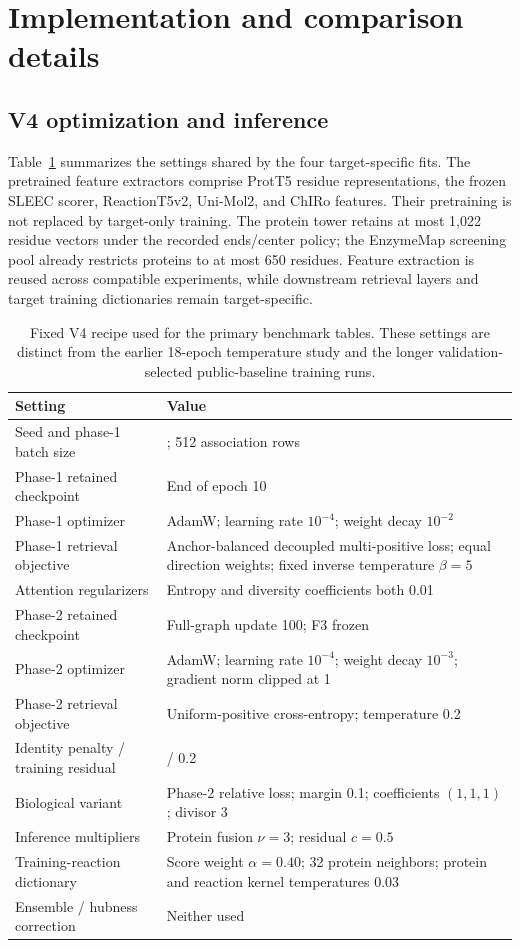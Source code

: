 \section{Implementation and comparison details}
\label{app:exp-implementation}

\subsection{V4 optimization and inference}
Table~\ref{tab:exp-recipe} summarizes the settings shared by the four
target-specific fits. The pretrained feature extractors comprise ProtT5
residue representations, the frozen SLEEC scorer, ReactionT5v2, Uni-Mol2,
and ChIRo features. Their pretraining is not replaced by target-only training.
The protein tower retains at most 1,022 residue vectors under the recorded
ends/center policy; the EnzymeMap screening pool already restricts proteins
to at most 650 residues. Feature extraction is reused across compatible
experiments, while downstream retrieval layers and target training dictionaries
remain target-specific.

\begin{table}[htbp]
\centering\small
\caption{Fixed V4 recipe used for the primary benchmark tables. These
settings are distinct from the earlier 18-epoch temperature study and the
longer validation-selected public-baseline training runs.}
\label{tab:exp-recipe}
\begin{tabularx}{\linewidth}{l>{\raggedright\arraybackslash}X}
\toprule
Setting & Value\\\midrule
Seed and phase-1 batch size & 42; 512 association rows\\
Phase-1 retained checkpoint & End of epoch 10\\
Phase-1 optimizer & AdamW; learning rate $10^{-4}$; weight decay $10^{-2}$\\
Phase-1 retrieval objective & Anchor-balanced decoupled multi-positive loss; equal direction weights; fixed inverse temperature $\beta=5$\\
Attention regularizers & Entropy and diversity coefficients both 0.01\\
Phase-2 retained checkpoint & Full-graph update 100; F3 frozen\\
Phase-2 optimizer & AdamW; learning rate $10^{-4}$; weight decay $10^{-3}$; gradient norm clipped at 1\\
Phase-2 retrieval objective & Uniform-positive cross-entropy; temperature 0.2\\
Identity penalty / training residual & 10 / 0.2\\
Biological variant & Phase-2 relative loss; margin 0.1; coefficients $(1,1,1)$; divisor 3\\
Inference multipliers & Protein fusion $\nu=3$; residual $c=0.5$\\
Training-reaction dictionary & Score weight $\alpha=0.40$; 32 protein neighbors; protein and reaction kernel temperatures 0.03\\
Ensemble / hubness correction & Neither used\\
\bottomrule
\end{tabularx}
\end{table}

